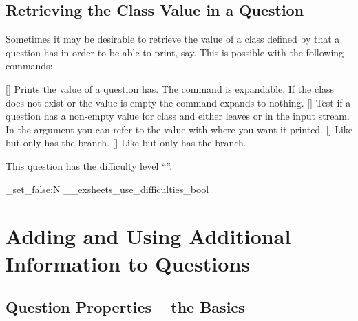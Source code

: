 \documentclass[load-preamble+,scrartcl={DIV10}]{cnltx-doc}
\begin{document}
\subsection{Retrieving the Class Value in a Question}\label{sec:retr-class-value}
Sometimes it may be desirable to retrieve the value of a class defined by
 that a question has in order to be able to print,
say.  This is possible with the following commands:
\begin{commands}
  \expandable{}[]
    Prints the value of  a question has.  The command is
    expandable.  If the class does not exist or the value is empty the command
    expands to nothing.
  []
    Test if a question has a non-empty value for class  and either
    leaves  or  in the input stream.  In the
     argument you can refer to the value with  where you
    want it printed.
  []
    Like  but only has the  branch.
  []
    Like  but only has the  branch.
\end{commands}

\begin{example}
  \begin{question}[difficulty=hard]
    This question has the difficulty level
    ``''.
  \end{question}
\end{example}

\ExplSyntaxOn
 \bool_set_false:N \g__exsheets_use_difficulties_bool
\ExplSyntaxOff

\section{Adding and Using Additional Information to
  Questions}\label{sec:additional_info}
\subsection{Question Properties -- the Basics}
\end{document}
